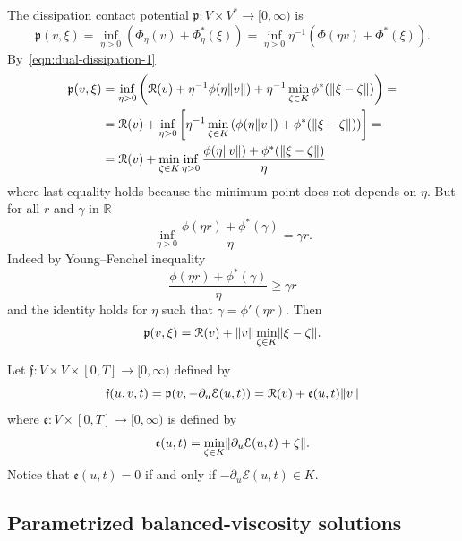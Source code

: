 The dissipation contact potential $\mathfrak{p}\colon V\times V^*\to[0,\infty)$ is
\begin{equation*}
\mathfrak{p}(v,\xi)=\inf_{\eta>0}\left(\Phi_\eta(v)+\Phi_\eta^*(\xi)\right)=\inf_{\eta>0}\eta^{-1}\left(\Phi(\eta v)+\Phi^*(\xi)\right).
\end{equation*}
By~\eqref{eqn:dual-dissipation-1}
\begin{equation*}
\begin{split}
\mathfrak{p}(v,\xi)&=\inf_{\eta>0}\left(\mathcal{R}(v)+\eta^{-1}\phi(\eta\lVert v\rVert)+\eta^{-1}\min_{\zeta\in K}\phi^*(\lVert\xi-\zeta\rVert)\right)=\\
&=\mathcal{R}(v)+\inf_{\eta>0}\left[\eta^{-1}\min_{\zeta\in K}\left(\phi(\eta\lVert v\rVert)+\phi^*(\lVert\xi-\zeta\rVert)\right)\right]=\\
&=\mathcal{R}(v)+\min_{\zeta\in K}\inf_{\eta>0}\frac{\phi(\eta\lVert v\rVert)+\phi^*(\lVert\xi-\zeta\rVert)}{\eta}
\end{split}
\end{equation*}
where last equality holds because the minimum point does not depends on $\eta$. But for all $r$ and $\gamma$ in $\mathbb{R}$
\begin{equation*}
\inf_{\eta>0}\frac{\phi(\eta r)+\phi^*(\gamma)}{\eta}=\gamma r.
\end{equation*}
Indeed by Young--Fenchel inequality
\begin{equation*}
\frac{\phi(\eta r)+\phi^*(\gamma)}{\eta}\ge\gamma r
\end{equation*}
and the identity holds for $\eta$ such that $\gamma=\phi'(\eta r)$. Then
\begin{equation}
\label{eqn:contact-dissipation-potantial-split}
\mathfrak{p}(v,\xi)=\mathcal{R}(v)+\lVert v\rVert\min_{\zeta\in K}\lVert\xi-\zeta\rVert.
\end{equation}

Let $\mathfrak{f}\colon V\times V\times[0,T]\to[0,\infty)$ defined by
\begin{equation}
\mathfrak{f}(u,v,t)=\mathfrak{p}(v,-\partial_u\mathcal{E}(u,t))=\mathcal{R}(v)+\mathfrak{e}(u,t)\lVert v\rVert
\end{equation}
where $\mathfrak{e}\colon V\times[0,T]\to[0,\infty)$ is defined by
\[
\mathfrak{e}(u,t)=\min_{\zeta\in K}\lVert\partial_u\mathcal{E}(u,t)+\zeta\rVert.
\]
Notice that $\mathfrak{e}(u,t)=0$ if and only if $-\partial_u\mathcal{E}(u,t)\in K$.

\subsection{Parametrized balanced-viscosity solutions}

